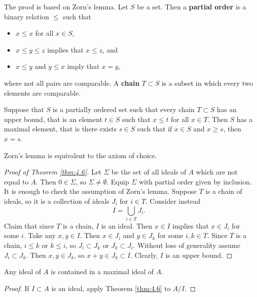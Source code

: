 The proof is based on Zorn's lemma. Let $ S $ be a set. Then a \textbf{partial order} is a binary relation $ \le $ such that
\begin{itemize}
\item $ x \le x $ for all $ x \in S $,
\item $ x \le y \le z $ implies that $ x \le z $, and
\item $ x \le y $ and $ y \le x $ imply that $ x = y $,
\end{itemize}
where not all pairs are comparable. A \textbf{chain} $ T \subset S $ is a subset in which every two elements are comparable.

\begin{lemma}[Zorn]
Suppose that $ S $ is a partially ordered set such that every chain $ T \subset S $ has an upper bound, that is an element $ t \in S $ such that $ x \le t $ for all $ x \in T $. Then $ S $ has a maximal element, that is there exists $ s \in S $ such that if $ x \in S $ and $ x \ge s $, then $ x = s $.
\end{lemma}

Zorn's lemma is equivalent to the axiom of choice.

\begin{proof}[Proof of Theorem \ref{thm:4.6}]
Let $ \Sigma $ be the set of all ideals of $ A $ which are not equal to $ A $. Then $ 0 \in \Sigma $, so $ \Sigma \ne \emptyset $. Equip $ \Sigma $ with partial order given by inclusion. It is enough to check the assumption of Zorn's lemma. Suppose $ T $ is a chain of ideals, so it is a collection of ideals $ J_i $ for $ i \in T $. Consider instead
$$ I = \bigcup_{i \in T} J_i. $$
Claim that since $ T $ is a chain, $ I $ is an ideal. Then $ x \in I $ implies that $ x \in J_i $ for some $ i $. Take any $ x, y \in I $. Then $ x \in J_i $ and $ y \in J_k $ for some $ i, k \in T $. Since $ T $ is a chain, $ i \le k $ or $ k \le i $, so $ J_i \subset J_k $ or $ J_k \subset J_i $. Without loss of generality assume $ J_i \subset J_k $. Then $ x, y \in J_k $, so $ x + y \in J_k \subset I $. Clearly, $ I $ is an upper bound.
\end{proof}

\pagebreak

\begin{corollary}
\label{cor:4.8}
Any ideal of $ A $ is contained in a maximal ideal of $ A $.
\end{corollary}

\begin{proof}
If $ I \subset A $ is an ideal, apply Theorem \ref{thm:4.6} to $ A / I $.
\end{proof}

